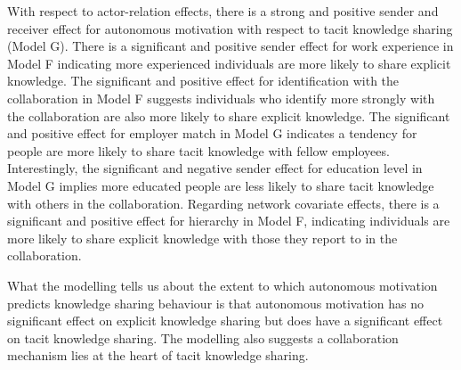 With respect to actor-relation effects, there is a strong and positive sender and receiver effect for autonomous motivation with respect to tacit knowledge sharing (Model G). There is a significant and positive sender effect for work experience in Model F indicating more experienced individuals are more likely to share explicit knowledge. The significant and positive effect for identification with the collaboration in Model F suggests individuals who identify more strongly with the collaboration are also more likely to share explicit knowledge. The significant and positive effect for employer match in Model G indicates a tendency for people are more likely to share tacit knowledge with fellow employees. Interestingly, the significant and negative sender effect for education level in Model G implies more educated people are less likely to share tacit knowledge with others in the collaboration. Regarding network covariate effects, there is a significant and positive effect for hierarchy in Model F, indicating individuals are more likely to share explicit knowledge with those they report to in the collaboration.\medskip

What the modelling tells us about the extent to which autonomous motivation predicts knowledge sharing behaviour is that autonomous motivation has no significant effect on explicit knowledge sharing but does have a significant effect on tacit knowledge sharing. The modelling also suggests a collaboration mechanism lies at the heart of tacit knowledge sharing.


